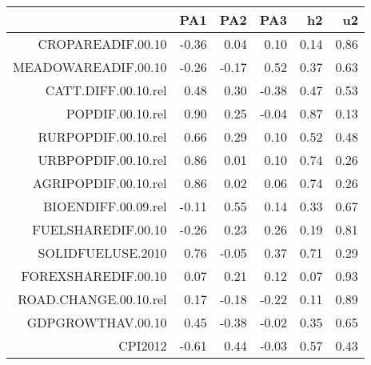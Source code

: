 \begin{table}[ht]
\centering
\begin{tabular}{rrrrrr}
  \hline
 & PA1 & PA2 & PA3 & h2 & u2 \\ 
  \hline
CROPAREADIF.00.10 & -0.36 & 0.04 & 0.10 & 0.14 & 0.86 \\ 
  MEADOWAREADIF.00.10 & -0.26 & -0.17 & 0.52 & 0.37 & 0.63 \\ 
  CATT.DIFF.00.10.rel & 0.48 & 0.30 & -0.38 & 0.47 & 0.53 \\ 
  POPDIF.00.10.rel & 0.90 & 0.25 & -0.04 & 0.87 & 0.13 \\ 
  RURPOPDIF.00.10.rel & 0.66 & 0.29 & 0.10 & 0.52 & 0.48 \\ 
  URBPOPDIF.00.10.rel & 0.86 & 0.01 & 0.10 & 0.74 & 0.26 \\ 
  AGRIPOPDIF.00.10.rel & 0.86 & 0.02 & 0.06 & 0.74 & 0.26 \\ 
  BIOENDIFF.00.09.rel & -0.11 & 0.55 & 0.14 & 0.33 & 0.67 \\ 
  FUELSHAREDIF.00.10 & -0.26 & 0.23 & 0.26 & 0.19 & 0.81 \\ 
  SOLIDFUELUSE.2010 & 0.76 & -0.05 & 0.37 & 0.71 & 0.29 \\ 
  FOREXSHAREDIF.00.10 & 0.07 & 0.21 & 0.12 & 0.07 & 0.93 \\ 
  ROAD.CHANGE.00.10.rel & 0.17 & -0.18 & -0.22 & 0.11 & 0.89 \\ 
  GDPGROWTHAV.00.10 & 0.45 & -0.38 & -0.02 & 0.35 & 0.65 \\ 
  CPI2012 & -0.61 & 0.44 & -0.03 & 0.57 & 0.43 \\ 
   \hline
\end{tabular}
\end{table}
